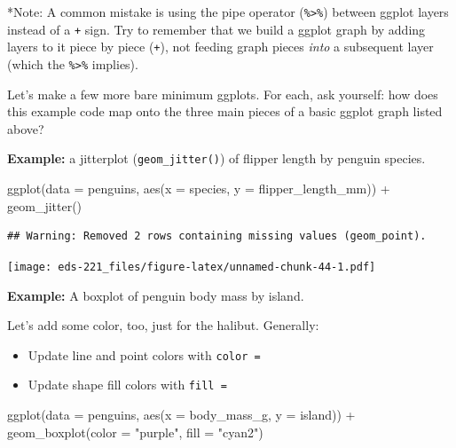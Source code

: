 \documentclass[
]{book}
\newenvironment{Shaded}{\begin{snugshade}}{\end{snugshade}}
\newcommand{\AttributeTok}[1]{\textcolor[rgb]{0.77,0.63,0.00}{#1}}
\newcommand{\FunctionTok}[1]{\textcolor[rgb]{0.00,0.00,0.00}{#1}}
\newcommand{\NormalTok}[1]{#1}
\newcommand{\SpecialCharTok}[1]{\textcolor[rgb]{0.00,0.00,0.00}{#1}}
\newcommand{\StringTok}[1]{\textcolor[rgb]{0.31,0.60,0.02}{#1}}
\providecommand{\tightlist}{%
  \setlength{\itemsep}{0pt}\setlength{\parskip}{0pt}}
\begin{document}
*Note: A common mistake is using the pipe operator (\texttt{\%\textgreater{}\%}) between ggplot layers instead of a \texttt{+} sign. Try to remember that we build a ggplot graph by adding layers to it piece by piece (\texttt{+}), not feeding graph pieces \emph{into} a subsequent layer (which the \texttt{\%\textgreater{}\%} implies).

Let's make a few more bare minimum ggplots. For each, ask yourself: how does this example code map onto the three main pieces of a basic ggplot graph listed above?

\textbf{Example:} a jitterplot (\texttt{geom\_jitter()}) of flipper length by penguin species.

\begin{Shaded}
\begin{Highlighting}[]
\FunctionTok{ggplot}\NormalTok{(}\AttributeTok{data =}\NormalTok{ penguins, }\FunctionTok{aes}\NormalTok{(}\AttributeTok{x =}\NormalTok{ species, }\AttributeTok{y =}\NormalTok{ flipper\_length\_mm)) }\SpecialCharTok{+}
  \FunctionTok{geom\_jitter}\NormalTok{()}
\end{Highlighting}
\end{Shaded}

\begin{verbatim}
## Warning: Removed 2 rows containing missing values (geom_point).
\end{verbatim}

\texttt{[image: eds-221\_files/figure-latex/unnamed-chunk-44-1.pdf]}

\textbf{Example:} A boxplot of penguin body mass by island.

Let's add some color, too, just for the halibut. Generally:

\begin{itemize}
\tightlist
\item
  Update line and point colors with \texttt{color\ =}
\item
  Update shape fill colors with \texttt{fill\ =}
\end{itemize}

\begin{Shaded}
\begin{Highlighting}[]
\FunctionTok{ggplot}\NormalTok{(}\AttributeTok{data =}\NormalTok{ penguins, }\FunctionTok{aes}\NormalTok{(}\AttributeTok{x =}\NormalTok{ body\_mass\_g, }\AttributeTok{y =}\NormalTok{ island)) }\SpecialCharTok{+}
  \FunctionTok{geom\_boxplot}\NormalTok{(}\AttributeTok{color =} \StringTok{"purple"}\NormalTok{, }\AttributeTok{fill =} \StringTok{"cyan2"}\NormalTok{)}
\end{Highlighting}
\end{Shaded}
\end{document}
